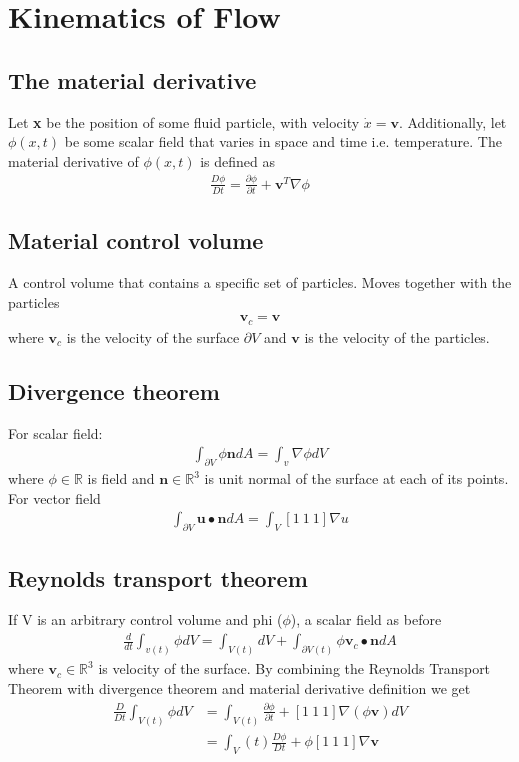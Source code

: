 
\section{Kinematics of Flow}

\subsection{The material derivative}
Let \textbf{x} be the position of some fluid particle, with velocity $\Dot{x}=\mathbf{v}$. Additionally, let $\phi(x,t)$ be some scalar field that varies in space and time i.e. temperature. The material derivative of $\phi(x,t)$ is defined as 
\begin{align}
    \frac{D\phi}{Dt}=\frac{\partial\phi}{\partial t} + \mathbf{v}^T\nabla\phi
\end{align}

\subsection{Material control volume}
A control volume that contains a specific set of particles. Moves together with the particles
\begin{align}
    \mathbf{v}_c=\mathbf{v}
\end{align}
where $\mathbf{v}_c$ is the velocity of the surface $\partial V$ and $\mathbf{v}$ is the velocity of the particles.

\subsection{Divergence theorem}
For scalar field:
\begin{align}
    \int_{\partial V}\phi\mathbf{n}dA=\int_v\nabla\phi dV
\end{align}
where $\phi \in \mathbb{R}$ is field and $\mathbf{n} \in \mathbb{R}^3$ is unit normal of the surface at each of its points. For vector field
\begin{align}
    \int_{\partial V}\mathbf{u}\bullet\mathbf{n}dA = \int_V [1\:1\: 1]\nabla u
\end{align}

\subsection{Reynolds transport theorem}
If V is an arbitrary control volume and phi ($\phi$), a scalar field as before
\begin{align}
    \frac{d}{dt}\int_{v(t)}\phi dV = \int_{V(t)} dV + \int_{\partial V(t)}\phi \mathbf{v}_c\bullet \mathbf{n} dA
\end{align}
where $\mathbf{v}_c \in \mathbb{R}^3$ is velocity of the surface. By combining the Reynolds Transport Theorem with divergence theorem and material derivative definition we get
\begin{align}
    \frac{D}{Dt}\int_{V(t)}\phi dV & = \int_{V(t)}\frac{\partial\phi}{\partial t}+[1\:1\: 1]\nabla (\phi \mathbf{v}) dV \\
    & = \int_V(t)\frac{D\phi}{Dt}+\phi[1\:1\: 1]\nabla \mathbf{v}
\end{align}

